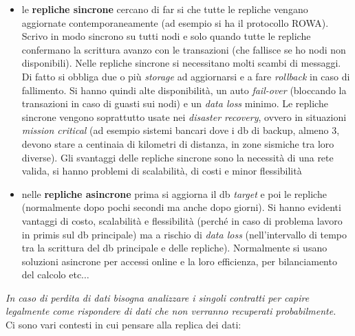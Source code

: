 \documentclass[a4paper,12pt, oneside]{book}
\begin{document}
\begin{itemize}
  \item le \textbf{repliche sincrone} cercano di far si che tutte le repliche
  vengano aggiornate contemporaneamente (ad esempio si ha il protocollo
  ROWA). Scrivo in modo sincrono su tutti nodi e solo quando tutte le repliche
  confermano la scrittura avanzo con le transazioni (che fallisce se ho nodi non
  disponibili). Nelle repliche sincrone si necessitano molti scambi di messaggi.
  Di fatto si obbliga due o più \textit{storage} ad aggiornarsi e a fare
  \textit{rollback} in caso di fallimento. Si hanno quindi alte disponibilità,
  un auto \textit{fail-over} (bloccando la transazioni in caso di guasti sui
  nodi) e un \textit{data loss} minimo. Le repliche sincrone vengono soprattutto
  usate nei \textit{disaster recovery}, ovvero in situazioni \textit{mission
    critical} (ad esempio sistemi bancari dove i db di backup, almeno 3, devono
  stare a centinaia di kilometri di distanza, in zone sismiche tra loro
  diverse). Gli svantaggi delle repliche sincrone sono la necessità di una rete
  valida, si hanno problemi di scalabilità, di costi e minor flessibilità
  \item nelle \textbf{repliche asincrone} prima si aggiorna il db
  \textit{target} e poi le repliche (normalmente dopo pochi secondi ma anche
  dopo giorni). Si hanno evidenti vantaggi di costo, scalabilità e flessibilità
  (perché in caso di problema lavoro in primis sul db principale)
  ma a rischio di \textit{data loss} (nell'intervallo di tempo tra la scrittura
  del db principale e delle repliche). Normalmente si usano soluzioni asincrone
  per accessi online e la loro efficienza, per bilanciamento del calcolo
  etc$\ldots$ 
\end{itemize}
\textit{In caso di perdita di dati bisogna analizzare i singoli contratti per
  capire legalmente come rispondere di dati che non verranno recuperati
  probabilmente.}\\
Ci sono vari contesti in cui pensare alla replica dei dati:
\end{document}

